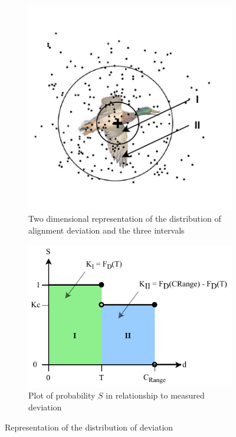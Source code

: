 \begin{figure}[ht]
    \centering
    \begin{subfigure}[b]{0.49\textwidth}
        \centering
        \includegraphics[width=\textwidth]{images/09/Hit Goose.pdf}
        \caption{Two dimensional representation of the distribution of alignment deviation and the three intervals}
        \label{fig:distribution-of-alignment-points-goose}
    \end{subfigure}
    \hfill
    \begin{subfigure}[b]{0.49\textwidth}
        \centering
        \includegraphics[width=\textwidth]{images/09/Probability Plot Two Interval.pdf}
        \caption{Plot of probability $S$ in relationship to measured deviation}
        \label{fig:distribution-of-alignment-points-graph}
    \end{subfigure}
    \caption{Representation of the distribution of deviation}
    \label{fig:distribution-of-alignment-points}
\end{figure}

